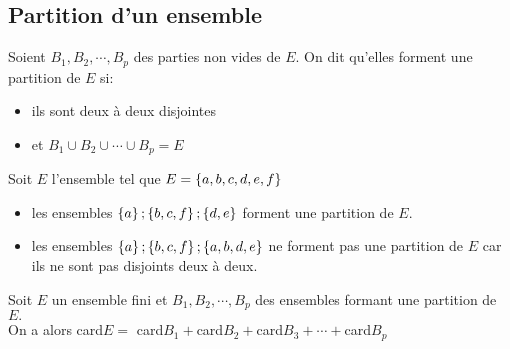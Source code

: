 \subsection*{Partition d'un ensemble}
\begin{definition}
Soient $ B_{1},B_{2}, \cdots, B_{p} $ des  parties non vides de $ E. $  On dit qu'elles forment une partition de $ E $ si:
\begin{itemize}
\item ils sont deux à deux disjointes 
\item  et $B_{1}\cup B_{2}\cup  \cdots\cup B_{p} =E $
\end{itemize}
\end{definition}
\begin{center}
\end{center}
\begin{example}
Soit $ E $ l'ensemble tel que $ E= \left\{a, b, c, d, e, f\right\} $
\begin{itemize}
\item[\textbullet] les ensembles  $ \left\{a\right\}; \left\{b, c,  f\right\}; \left\{d,e\right\} $ forment une partition de $ E. $
\item[\textbullet] les ensembles  $ \left\{a\right\}; \left\{b, c,  f\right\}; \left\{a, b,d,e\right\} $ ne  forment pas une partition de $ E$ car ils ne  sont pas disjoints deux à deux.
\end{itemize}
\end{example}
\begin{property}
Soit $ E $ un ensemble fini et  $ B_{1}, B_{2}, \cdots, B_{p} $ des ensembles formant une partition de $ E. $ \\
On a alors  card$ E= $ card$ B_{1}+ $card$ B_{2} + $card$ B_{3}+ \cdots + $card$ B_{p} $
\end{property}

